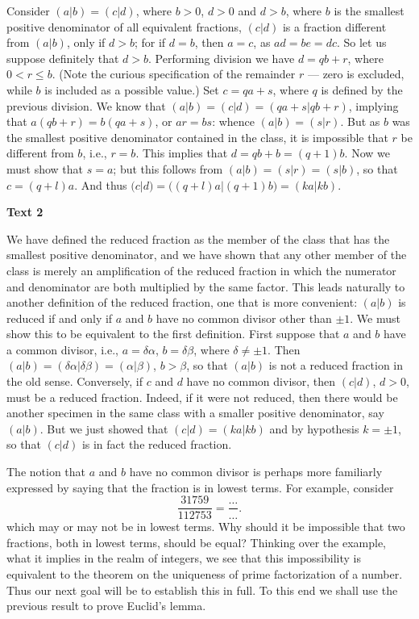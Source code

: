 \documentclass[a4paper]{article}
\newcommand{\ESect}[1]{\medskip\par{\large \textbf{#1}}\par}
\begin{document}
Consider $(a|b)=(c|d)$, where $b > 0$, $d > 0$ and $d > b$, where $b$ is the smallest positive denominator of all equivalent
fractions, $(c|d)$ is a fraction different from $(a|b)$, only if $d > b$; for if $d=b$, then $a=c$, as $ad=be=dc$. So let us
suppose definitely that $d > b$. Performing division we have $d = qb + r$, where $0 < r \leqslant b$. (Note the curious
specification of the remainder $r$ --- zero is excluded, while $b$ is included as a possible value.) Set $c=qa+s$, where $q$
is defined by the previous division. We know that $(a|b)=(c|d)=(qa + s|qb + r)$, implying that $a(qb+r)=b(qa + s)$, or $ar=bs$:
whence $(a|b)=(s|r)$. But as $b$ was the smallest positive denominator contained in the class, it is impossible that $r$ be
different from $b$, i.e., $r=b$. This implies that $d=qb+b=(q+1)b$. Now we must show that $s=a$; but this follows from
$(a|b)=(s|r)=(s|b)$, so that $c=(q+l)a$. And thus $(c|d)=\bigl((q+l)a|(q+1)b\bigl)=(ka|kb)$.

\ESect{Text 2}
We have defined the reduced fraction as the member of the class that has the smallest positive denominator, and we have shown
that any other member of the class is merely an amplification of the reduced fraction in which the numerator and denominator
are both multiplied by the same factor. This leads naturally to another definition of the reduced fraction, one that is more
convenient: $(a|b)$ is reduced if and only if $a$ and $b$ have no common divisor other than $\pm 1$. We must show this to be
equivalent to the first definition. First suppose that $a$ and $b$ have a common divisor, i.e., $a = \delta \alpha$,
$b = \delta \beta$, where $\delta \neq \pm 1$. Then $(a|b)=(\delta \alpha|\delta \beta)=(\alpha|\beta)$, $b > \beta$, so that
$(a|b)$ is not a reduced fraction in the old sense. Conversely, if $c$ and $d$ have no common divisor, then $(c|d)$, $d > 0$,
must be a reduced fraction. Indeed, if it were not reduced, then there would be another specimen in the same class with a
smaller positive denominator, say $(a|b)$. But we just showed that $(c|d)=(ka|kb)$ and by hypothesis $k=\pm 1$, so that
$(c|d)$ is in fact the reduced fraction.

The notion that $a$ and $b$ have no common divisor is perhaps more familiarly expressed by saying that the fraction is in
lowest terms. For example, consider
$$\frac{31759}{112753}=\frac{\ldots}{\ldots}.$$
which may or may not be in lowest terms. Why should it be impossible that two fractions, both in lowest terms, should be
equal? Thinking over the example, what it implies in the realm of integers, we see that this impossibility is equivalent to
the theorem on the uniqueness of prime factorization of a number. Thus our next goal will be to establish this in full.
To this end we shall use the previous result to prove Euclid's lemma.
\end{document}
